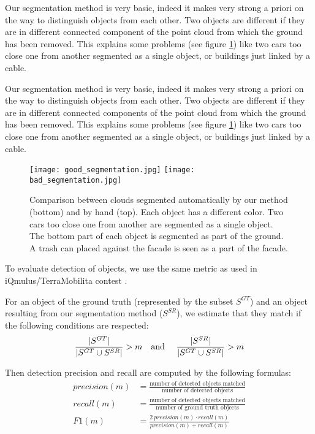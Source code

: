 \documentclass[a4paper, 10pt, journal]{article}
\begin{document}
Our segmentation method is very basic, indeed it makes very strong a priori on the way to distinguish objects from each other. Two objects are different if they are in different connected component of the point cloud from which the ground has been removed. This explains some problems (see figure \ref{fig:segm}) like two cars too close one from another segmented as a single object, or buildings just linked by a cable.

Our segmentation method is very basic, indeed it makes very strong a priori on the way to distinguish objects from each other. Two objects are different if they are in different connected components of the point cloud from which the ground has been removed. This explains some problems (see figure \ref{fig:segm}) like two cars too close one from another segmented as a single object, or buildings just linked by a cable.


\begin{figure}[h]\centering
 \texttt{[image: good\_segmentation.jpg]}\vspace{0.2cm}
 \texttt{[image: bad\_segmentation.jpg]}
 \caption{Comparison between clouds segmented automatically by our method (bottom) and by hand (top). Each object has a different color. Two cars too close one from another are segmented as a single object. The bottom part of each object is segmented as part of the ground. A trash can placed against the facade is seen as a part of the facade.\label{fig:segm}}
\end{figure}

To evaluate detection of objects, we use the same metric as used in iQmulus/TerraMobilita contest \cite{vallet2015terramobilita}.

For an object of the ground truth (represented by the subset $S^{GT}$) and an object resulting from our segmentation method ($S^{SR}$), we estimate that they match if the following conditions are respected:
\begin{equation*}
 \frac{|S^{GT}|}{|S^{GT} \cup S^{SR}|} > m \text{\quad and \quad} \frac{|S^{SR}|}{|S^{GT} \cup S^{SR}|} > m
\end{equation*}

Then detection precision and recall are computed by the following formulas:
\begin{align*} 
 precision(m) &= \frac{\text{number of detected objects matched}}{\text{number of detected objects}} \\
 recall(m) &= \frac{\text{number of detected objects matched}}{\text{number of ground truth objects}} \\
 F1(m) &= \frac{2~ precision(m) \cdot recall(m)}{precision(m) + recall(m)}
\end{align*}
\end{document}
